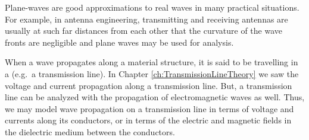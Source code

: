 Plane-waves are good approximations to real waves in many practical situations. For example, in antenna engineering, transmitting and receiving antennas are usually at such far distances from each other that the curvature of the wave fronts are negligible and plane waves may be used for analysis. \par 

When a wave propagates along a material structure, it is said to be travelling in a  (e.g.\ a transmission line). In Chapter \ref{ch:TransmissionLineTheory} we saw the voltage and current propagation along a transmission line. But, a transmission line can be analyzed with the propagation of electromagnetic waves as well. Thus, we may model wave propagation on a transmission line in terms of voltage and currents along its conductors, or in terms of the electric and magnetic fields in the dielectric medium between the conductors. 

